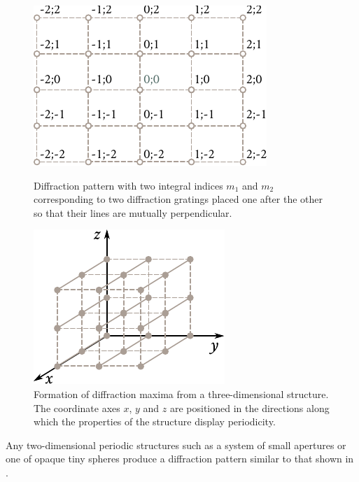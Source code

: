 \begin{figure}[!htb]
	\begin{minipage}[t]{0.48\linewidth}
		\begin{center}
			\includegraphics[scale=1]{figures/ch_18/fig_18_39.pdf}
            \caption[]{Diffraction pattern with two integral indices $m_1$ and $m_2$ corresponding to two diffraction gratings placed one after the other so that their lines are mutually perpendicular.}
			\label{fig:18_39}
		\end{center}
	\end{minipage}
	\hfill{ }%
	\begin{minipage}[t]{0.48\linewidth}
		\begin{center}
			\includegraphics[scale=1]{figures/ch_18/fig_18_40.pdf}
			\caption[]{Formation of diffraction maxima from a three-dimensional structure. The coordinate axes $x$, $y$ and $z$ are positioned in the directions along which the properties of the structure display periodicity.}
			\label{fig:18_40}
		\end{center}
	\end{minipage}
\vspace{-0.4cm}
\end{figure}

Any two-dimensional periodic structures such as a system of small apertures or one of opaque tiny spheres produce a diffraction pattern similar to that shown in .

